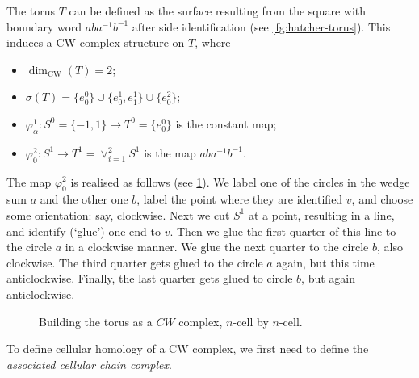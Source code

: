 \documentclass[12pt]{article}
\numberwithin{equation}{subsection}
\numberwithin{theorem}{subsection}
\numberwithin{lemma}{subsection}
\numberwithin{corollary}{subsection}
\numberwithin{definition}{subsection}
\numberwithin{example}{subsection}
\numberwithin{note}{subsection}
\begin{document}
\begin{appendices}
            \begin{example}
                The torus $T$ can be defined as the surface resulting from the square with boundary word $aba^{-1}b^{-1}$ after side identification (see \cref{fg:hatcher-torus}).
                This induces a CW-complex structure on $T$, where
                \begin{itemize}
                    \item $\dim_\text{CW}(T) = 2$;
                    \item $\sigma(T) = \{e^0_0\}\cup\{e^1_0,e^1_1\}\cup\{e^2_0\}$;
                    \item $\varphi_\alpha^1\colon S^0=\{-1,1\}\to T^0=\{e_0^0\}$ is the constant map;
                    \item $\varphi_0^2\colon S^1\to T^1=\vee_{i=1}^2 S^1$ is the map $aba^{-1}b^{-1}$.
                \end{itemize}
                The map $\varphi_0^2$ is realised as follows (see \cref{fg:tim-torus}).
                We label one of the circles in the wedge sum $a$ and the other one $b$, label the point where they are identified $v$, and choose some orientation: say, clockwise.
                Next we cut $S^1$ at a point, resulting in a line, and identify (`glue') one end to $v$.
                Then we glue the first quarter of this line to the circle $a$ in a clockwise manner.
                We glue the next quarter to the circle $b$, also clockwise.
                The third quarter gets glued to the circle $a$ again, but this time anticlockwise.
                Finally, the last quarter gets glued to circle $b$, but again anticlockwise.
            \end{example}

            \begin{figure}[ht]
                \centering
                \caption{Building the torus as a $CW$ complex, $n$-cell by $n$-cell.}\label{fg:tim-torus}
            \end{figure}

            To define cellular homology of a CW complex, we first need to define the \emph{associated cellular chain complex}.


\end{appendices}
\end{document}
